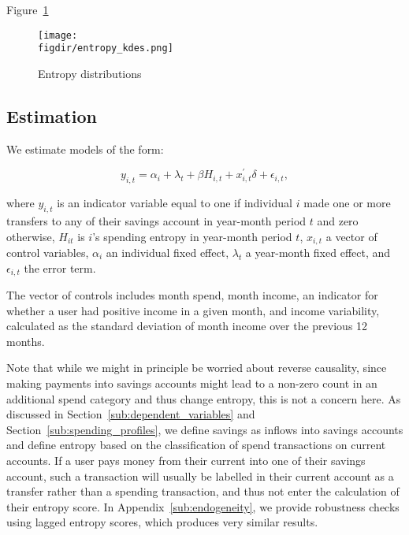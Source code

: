 Figure~\ref{fig:entropy_kdes}
\begin{figure}[H]
    \center \newcommand\width{\textwidth} \caption{Entropy distributions}
    \label{fig:entropy_kdes}
    \texttt{[image: \\figdir/entropy\_kdes.png]}
    \fignote{\width}{}
\end{figure}


\subsection{Estimation}%
\label{sub:estimation}

We estimate models of the form: 

\begin{equation}
    y_{i,t} = \alpha_i + \lambda_t + \beta H_{i,t} + x^\prime_{i,t} \delta +
    \epsilon_{i,t},
\end{equation}

\noindent where $y_{i,t}$ is an indicator variable equal to one if individual $i$ made
one or more transfers to any of their savings account in year-month period $t$ and zero
otherwise, $H_{it}$ is $i$'s spending entropy in year-month period $t$, $x_{i,t}$ a vector
of control variables, $\alpha_i$ an individual fixed effect, $\lambda_t$ a
year-month fixed effect, and $\epsilon_{i, t}$ the error term.

The vector of controls includes month spend, month income, an indicator for
whether a user had positive income in a given month, and income
variability, calculated as the standard deviation of month income over the
previous 12 months.

Note that while we might in principle be worried about reverse causality, since
making payments into savings accounts might lead to a non-zero count in an
additional spend category and thus change entropy, this is not a concern here.
As discussed in Section~\ref{sub:dependent_variables} and
Section~\ref{sub:spending_profiles}, we define savings as inflows into savings
accounts and define entropy based on the classification of spend transactions
on current accounts. If a user pays money from their current into one of their
savings account, such a transaction will usually be labelled in their current
account as a transfer rather than a spending transaction, and thus not enter
the calculation of their entropy score. In Appendix~\ref{sub:endogeneity}, we
provide robustness checks using lagged entropy scores, which produces very
similar results.

